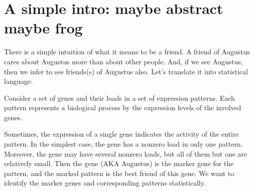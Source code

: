 \documentclass{llncs}
\begin{document}
\begin{abstract}

\textcolor{green}{We define a tag's most friendly cloud as a cloud that pays maximal rank-normalized attention to the tag.}
\textcolor{blue}{ -- we will return here --} \textcolor{purple}{
Suppose we have a set of {\tag}s and a set of fuzzy set of {\tag}s, which we will refer to as {\cloud}s, and we have the {\tag}-to-{\cloud} relation quantified as a scalar for each $\left( {\tag},{\cloud}\right)$ pair. An example is: {\tag}s are genes, {\cloud}s are gene expression patterns, and the scalars are loads of the genes in the patterns. Sometimes, an observation that a gene is expressed implies the expression of a particular pattern (the simplest case is: the gene has nonzero load only in that pattern). If so, we say that the gene marks the pattern. Here we describe a statistical test that identifies pairs of a marker {\tag} and the marked {\cloud}. The test is based on rank statistics and it does not rely on propositions about the distribution of the relation quantity. The marked {\cloud} is referred to as the {\tag}'s best friend, and the test is named "the best friends test" or "the gene's best friends test". The statistics naturally expand to the case when a {\tag} selects (separates) a subset of {\cloud}s, thus having more than one best friend. The code (currently, only R) is available at \url{https://github.com/favorov/best-friends}
}
\end{abstract}
%
\section{A simple intro: maybe abstract maybe frog}

There is a simple intuition of what it means to be a friend. A friend of Augustus cares about Augustus more than about other people. And, if we see Augustus, then we infer to see friends(s) of Augustus also. Let’s translate it into statistical language.

Consider a set of genes and their loads in a set of expression patterns. Each pattern represents a biological process by the expression levels of the involved genes. 

Sometimes, the expression of a single gene indicates the activity of the entire pattern. In the simplest case, the gene has a nonzero load in only one pattern. 
Moreover, the gene may have several nonzero loads, but all of them but one are relatively small. Then the gene (AKA Augustus) is the marker gene for the pattern, and the marked pattern is the best friend of this gene. We want to identify the marker genes and corresponding patterns statistically.  
\end{document}
